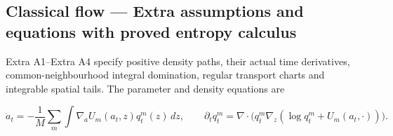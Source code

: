 \documentclass[11pt,a4paper]{report}
\begin{document}
\subsection{\texorpdfstring{Classical flow — Extra assumptions and equations with proved entropy calculus}{Classical flow — Extra assumptions and equations with proved entropy calculus}}



Extra A1–Extra A4 specify positive density paths, their actual time derivatives, common-neighbourhood integral domination, regular transport charts and integrable spatial tails. The parameter and density equations are



\[\dot a_t=-\frac1M\sum_m\int\nabla_a U_m(a_t,z)q_t^m(z)\,dz,\qquad\partial_tq_t^m=\nabla\!\cdot\!\bigl(q_t^m\nabla_z(\log q_t^m+U_m(a_t,\cdot))\bigr).\]
\end{document}
